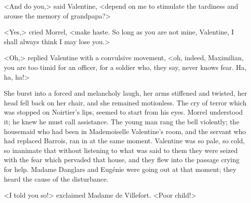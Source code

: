  <And do you,> said Valentine, <depend on me to stimulate the tardiness and arouse the memory of grandpapa?> 

 <Yes,> cried Morrel, <make haste. So long as you are not mine, Valentine, I shall always think I may lose you.> 

 <Oh,> replied Valentine with a convulsive movement, <oh, indeed, Maximilian, you are too timid for an officer, for a soldier who, they say, never knows fear. Ha, ha, ha!> 

 She burst into a forced and melancholy laugh, her arms stiffened and twisted, her head fell back on her chair, and she remained motionless. The cry of terror which was stopped on Noirtier's lips, seemed to start from his eyes. Morrel understood it; he knew he must call assistance. The young man rang the bell violently; the housemaid who had been in Mademoiselle Valentine's room, and the servant who had replaced Barrois, ran in at the same moment. Valentine was so pale, so cold, so inanimate that without listening to what was said to them they were seized with the fear which pervaded that house, and they flew into the passage crying for help. Madame Danglars and Eugénie were going out at that moment; they heard the cause of the disturbance. 

 <I told you so!> exclaimed Madame de Villefort. <Poor child!>  